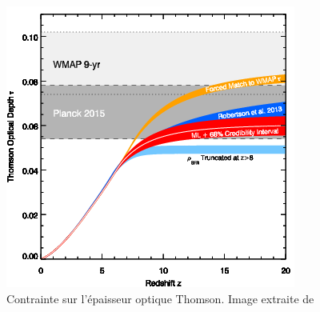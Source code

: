 \begin{figure}
        \includegraphics[width=.9\linewidth]{img/01/epaisseur_optique_thomson.png} 
        \caption[Epaisseur optique Thomson]{%
		Contrainte sur l'épaisseur optique Thomson.
        Image extraite de \cite{2015ApJ...802L..19R}
 		\label{fig:epaisseur_optique_thomson} }
\end{figure}

%


%
%


